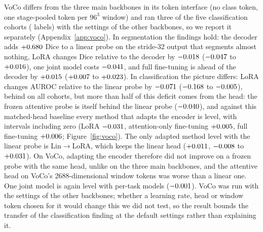 VoCo differs from the three main backbones in its token interface (no class token, one stage-pooled token per $96^3$ window) and ran three of the five classification cohorts (\numLabelsVocoN{} labels) with the settings of the other backbones, so we report it separately (Appendix~\ref{app:voco}). In segmentation the findings hold: the decoder adds $+0.680$ Dice to a linear probe on the stride-32 output that segments almost nothing, LoRA changes Dice relative to the decoder by $-0.018$ ($-0.047$ to $+0.016$), one joint model costs $-0.041$, and full fine-tuning is ahead of the decoder by $+0.015$ ($+0.007$ to $+0.023$). In classification the picture differs: LoRA changes AUROC relative to the linear probe by $-0.071$ ($-0.168$ to $-0.005$), behind on all \numCiClsloralinVocoClustersN{} cohorts, but more than half of this deficit comes from the head: the frozen attentive probe is itself behind the linear probe ($-0.040$), and against this matched-head baseline every method that adapts the encoder is level, with intervals including zero (LoRA $-0.031$, attention-only fine-tuning $+0.005$, full fine-tuning $+0.006$; Figure~\ref{fig:voco}). The only adapted method level with the linear probe is Lin$\to$LoRA, which keeps the linear head ($+0.011$, $-0.008$ to $+0.031$). On VoCo, adapting the encoder therefore did not improve on a frozen probe with the same head, unlike on the three main backbones, and the attentive head on VoCo's 2688-dimensional window tokens was worse than a linear one. One joint model is again level with per-task models ($-0.001$). VoCo was run with the settings of the other backbones; whether a learning rate, head or window token chosen for it would change this we did not test, so the result bounds the transfer of the classification finding at the default settings rather than explaining it.
